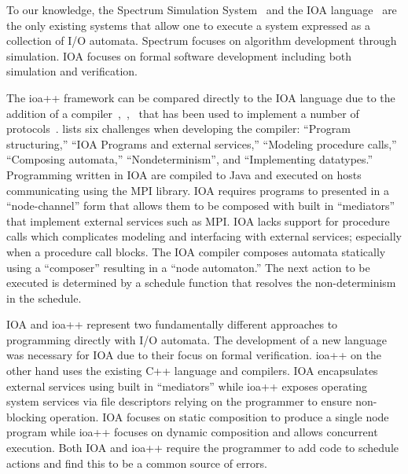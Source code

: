 To our knowledge, the Spectrum Simulation System~\cite{goldman1990distributed} and the IOA language~\cite{garland2003ioa} are the only existing systems that allow one to execute a system expressed as a collection of I/O automata.
Spectrum focuses on algorithm development through simulation.
IOA focuses on formal software development including both simulation and verification.

The ioa++ framework can be compared directly to the IOA language due to the addition of a compiler~\cite{tsai2002code},~\cite{tauber2004verifiable},~\cite{tauber2004compiling} that has been used to implement a number of protocols~\cite{georgiou2009automated}.
\cite{georgiou2009automated} lists six challenges when developing the compiler: ``Program structuring,'' ``IOA Programs and external services,'' ``Modeling procedure calls,'' ``Composing automata,'' ``Nondeterminism'', and ``Implementing datatypes.''
Programming written in IOA are compiled to Java and executed on hosts communicating using the MPI library.
IOA requires programs to presented in a ``node-channel'' form that allows them to be composed with built in ``mediators'' that implement external services such as MPI.
IOA lacks support for procedure calls which complicates modeling and interfacing with external services; especially when a procedure call blocks.
The IOA compiler composes automata statically using a ``composer'' resulting in a ``node automaton.''
The next action to be executed is determined by a schedule function that resolves the non-determinism in the schedule.

IOA and ioa++ represent two fundamentally different approaches to programming directly with I/O automata.
The development of a new language was necessary for IOA due to their focus on formal verification.
ioa++ on the other hand uses the existing C++ language and compilers.
IOA encapsulates external services using built in ``mediators'' while ioa++ exposes operating system services via file descriptors relying on the programmer to ensure non-blocking operation.
IOA focuses on static composition to produce a single node program while ioa++ focuses on dynamic composition and allows concurrent execution.
Both IOA and ioa++ require the programmer to add code to schedule actions and find this to be a common source of errors.










